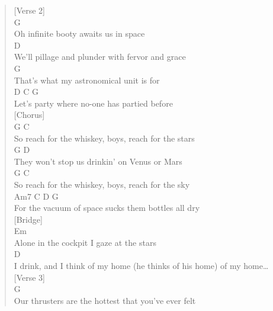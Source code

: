 \documentclass[11pt]{article}
\begin{document}
\begin{verse}
[Verse 2]\\
\hspace*{8em}G\\
Oh infinite booty awaits us in space\\
\hspace*{7em}D\\
We'll pillage and plunder with fervor and grace\\
\hspace*{13em}G\\
That's what my astronomical unit is for\\
\hspace*{7em}D                       C         G\\
Let's party where no-one has partied before\\
\vspace*{1em}
[Chorus]\\
\hspace*{5em}G                                        C\\
So reach for the whiskey, boys, reach for the stars\\
\hspace*{6em}G                          D\\
They won't stop us drinkin' on Venus or Mars\\
\hspace*{5em}G                                          C\\
So reach for the whiskey, boys, reach for the sky\\
\hspace*{9em}Am7         C               D           G\\
For the vacuum of space sucks them bottles all dry\\
\vspace*{1em}
[Bridge]\\
\hspace*{2em}Em\\
Alone in the cockpit I gaze at the stars\\
\hspace*{29em}D\\
I drink, and I think of my home (he thinks of his home) of my home\ldots{}\\
\vspace*{1em}
[Verse 3]\\
\hspace*{7em}G\\
Our thrusters are the hottest that you've ever felt\\

\end{verse}
\end{document}
